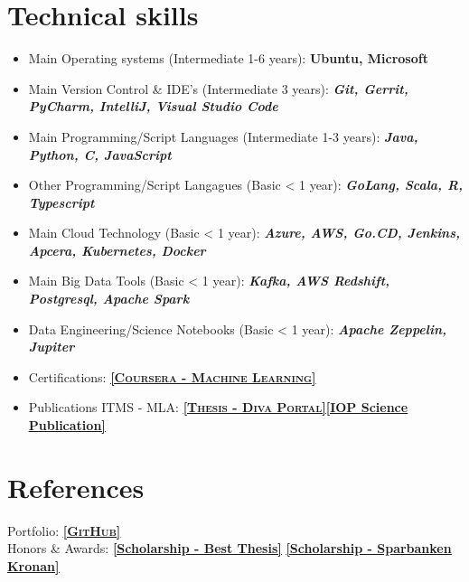 \documentclass[11pt,a4paper,sans,colorlinks,linkcolor=blue,urlcolor=blue]{moderncv}
\begin{document}
\section{Technical skills}
\begin{itemize}
    \item Main Operating systems (Intermediate 1-6 years): \textbf{Ubuntu, Microsoft}
    \item Main Version Control \& IDE's (Intermediate 3 years): \textbf{\textit{Git, Gerrit, PyCharm, IntelliJ, Visual Studio Code}}
    \item Main Programming/Script Languages (Intermediate 1-3 years): \textbf{\textit{Java, Python, C, JavaScript}}
    \item Other Programming/Script Langagues (Basic < 1 year): \textbf{\textit{GoLang, Scala, R, Typescript}}
    \item Main Cloud Technology (Basic < 1 year): \textbf{\textit{Azure, AWS, Go.CD, Jenkins, Apcera, Kubernetes, Docker}}
    \item Main Big Data Tools (Basic < 1 year): \textbf{\textit{Kafka, AWS Redshift, Postgresql, Apache Spark}}
    \item Data Engineering/Science Notebooks (Basic < 1 year): \textbf{\textit{Apache Zeppelin, Jupiter}}
    \item Certifications: \href{https://www.coursera.org/account/accomplishments/certificate/W5HM63ABYCDV}{\textbf{\textsc{\underline{[Coursera - Machine Learning]}}}}
    \item Publications ITMS - MLA\footnotemark[2]: \href{http://hh.diva-portal.org/smash/record.jsf?pid=diva2%3A1113511&dswid=4291#sthash.wwKv4JYI.dpbs}{\textbf{\textsc{\underline{[Thesis - Diva Portal]}}}}\href{http://iopscience.iop.org/article/10.1088/1757-899X/252/1/012018/pdf;jsessionid=EF9A9E415EC41D639019919DC566B21F.c4.iopscience.cld.iop.org}{\textbf{\underline{[IOP Science Publication]}}}
\end{itemize}
\section{References}
Portfolio: \underline{\href{https://github.com/Thelin90}{\textbf{\textsc{[GitHub]}}}}\\
Honors \& Awards: \href{https://www.hms-networks.com/work/in/sweden/hms-scholarship}{\textbf{\underline{[Scholarship - Best Thesis]}}} \href{http://www.hh.se/omhogskolan/aktuellt/nyheter/nyheter/studenterbelonasavsparbanksstiftelsenkronan.65446700.html}{\textbf{\underline{[Scholarship - Sparbanken Kronan]}}}

     
     
\vfill
\enlargethispage{\footskip}
\end{document}
